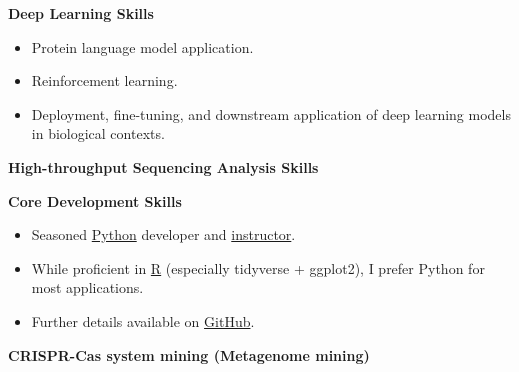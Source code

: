 
\textbf{Deep Learning Skills}
\begin{itemize}
    \item Protein language model application.
    \item Reinforcement learning.
    \item Deployment, fine-tuning, and downstream application of deep learning models in biological contexts.
\end{itemize}

\textbf{High-throughput Sequencing Analysis Skills}

\textbf{Core Development Skills}\\

\begin{itemize}
    \item Seasoned \underline{Python} developer and \href{https://www.bioinfo.info/p/t_pc/goods_pc_detail/goods_detail/course_2SvfNlIVzrKfOcexHk9Nute5Bhd}{instructor}.
    \item While proficient in \underline{R} (especially tidyverse + ggplot2), I prefer Python for most applications.
    \item Further details available on \href{https://github.com/hermanzhaozzzz}{GitHub}.
\end{itemize}




\textbf{CRISPR-Cas system mining (Metagenome mining)}


  
  
  
  
